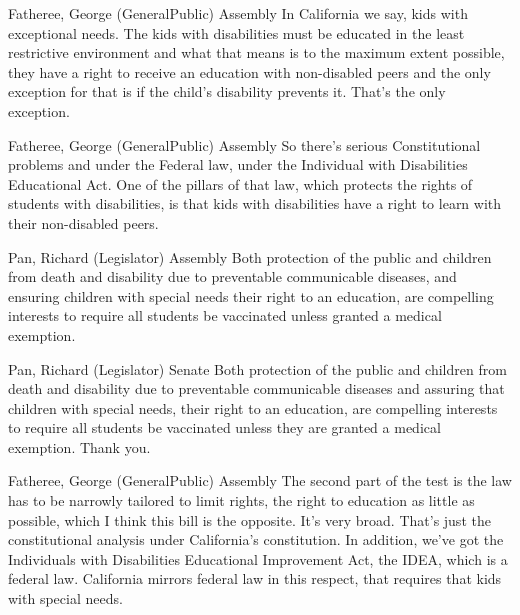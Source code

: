 \begin{result}{24.12091894665227}{Fatheree, George (GeneralPublic) Assembly}
In California we say, kids with exceptional needs. The kids with disabilities must be educated in the least restrictive environment and what that means is to the maximum extent possible, they have a right to receive an education with non-disabled peers and the only exception for that is if the child's disability prevents it. That's the only exception.
\end{result}

\begin{result}{15.144270314277417}{Fatheree, George (GeneralPublic) Assembly}
So there's serious Constitutional problems and under the Federal law, under the Individual with Disabilities Educational Act. One of the pillars of that law, which protects the rights of students with disabilities, is that kids with disabilities have a right to learn with their non-disabled peers.
\end{result}

\begin{result}{14.434302341382798}{Pan, Richard (Legislator) Assembly}
Both protection of the public and children from death and disability due to preventable communicable diseases, and ensuring children with special needs their right to an education, are compelling interests to require all students be vaccinated unless granted a medical exemption.
\end{result}

\begin{result}{13.880531196968432}{Pan, Richard (Legislator) Senate}
Both protection of the public and children from death and disability due to preventable communicable diseases and assuring that children with special needs, their right to an education, are compelling interests to require all students be vaccinated unless they are granted a medical exemption. Thank you.
\end{result}

\begin{result}{13.081970355015326}{Fatheree, George (GeneralPublic) Assembly}
The second part of the test is the law has to be narrowly tailored to limit rights, the right to education as little as possible, which I think this bill is the opposite. It's very broad. That's just the constitutional analysis under California's constitution. In addition, we've got the Individuals with Disabilities Educational Improvement Act, the IDEA, which is a federal law. California mirrors federal law in this respect, that requires that kids with special needs.
\end{result}

